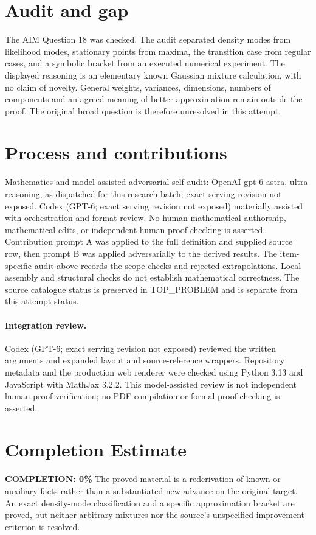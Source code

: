 \documentclass[11pt]{article}
\begin{document}
\section{Audit and gap}
The AIM Question 18 was checked. The audit separated density modes from
likelihood modes, stationary points from maxima, the transition case
from regular cases, and a symbolic bracket from an executed numerical
experiment. The displayed reasoning is an elementary known Gaussian
mixture calculation, with no claim of novelty. General weights, variances,
dimensions, numbers of components and an agreed meaning of better
approximation remain outside the proof. The original broad question
is therefore unresolved in this attempt.

\section{Process and contributions}
Mathematics and model-assisted adversarial self-audit: OpenAI gpt-6-astra, ultra reasoning, as dispatched for this research batch; exact serving revision not exposed. Codex (GPT-6; exact serving revision not exposed) materially assisted with orchestration and format review. No human mathematical authorship, mathematical edits, or independent human proof checking is asserted.
Contribution prompt A was applied to the full definition and supplied source row, then prompt B was applied adversarially to the derived results. The item-specific audit above records the scope checks and rejected extrapolations. Local assembly and structural checks do not establish mathematical correctness. The source catalogue status is preserved in TOP\_PROBLEM and is separate from this attempt status.
\paragraph{Integration review.} Codex (GPT-6; exact serving revision not exposed) reviewed the written arguments and expanded layout and source-reference wrappers. Repository metadata and the production web renderer were checked using Python 3.13 and JavaScript with MathJax 3.2.2. This model-assisted review is not independent human proof verification; no PDF compilation or formal proof checking is asserted.

\section{Completion Estimate}
\noindent\textbf{COMPLETION: 0\%}
The proved material is a rederivation of known or auxiliary facts rather than a substantiated new advance on the original target. An exact density-mode classification and a specific approximation bracket are proved, but neither arbitrary mixtures nor the source’s unspecified improvement criterion is resolved.
\end{document}
